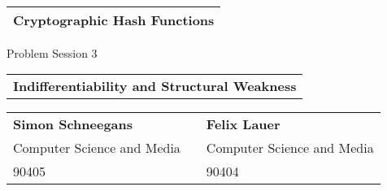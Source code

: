 \thispagestyle{empty}
\ \\[3cm]
\begin{tabular}[b]{l}
    \Huge \textbf{Cryptographic Hash Functions} \hspace{12.5cm} \\[1mm]
    \hline
\end{tabular}

\begin{flushright}
    {\large Problem Session 3} \\[8cm]
\end{flushright}

\begin{tabular}[b]{l}
    \LARGE \textbf{Indifferentiability and Structural Weakness} \\[4cm]
\end{tabular}

\begin{tabular}{lcl}
    \textbf{Simon Schneegans} &\hspace{1cm} & \textbf{Felix Lauer} \\
    Computer Science and Media & \hspace{1cm}  & Computer Science and Media\\
    90405  &\hspace{1cm} & 90404 \\[1.5cm]
\end{tabular}

\newpage

